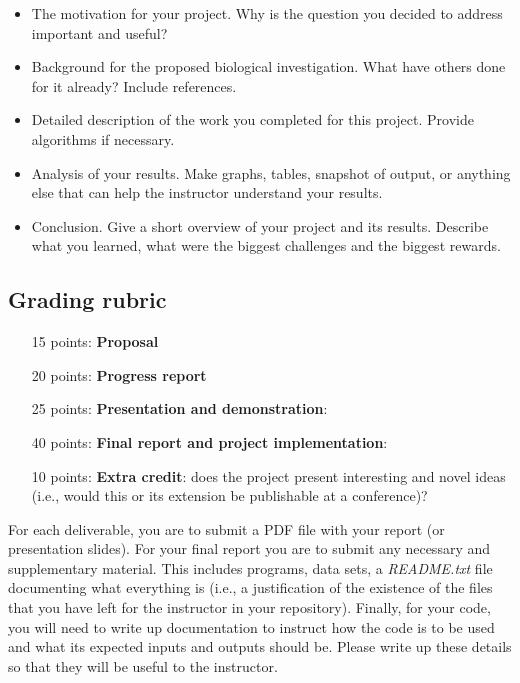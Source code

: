 \begin{enumerate}
\begin{itemize}

	\item The motivation for your project. Why is the question you decided to address important and useful?
	\item Background for the proposed biological investigation. What have others done for it already? Include references.
	\item Detailed  description of the work you completed for this project. Provide algorithms if necessary.
	\item Analysis of your results. Make graphs, tables, snapshot of output, or anything else that can help the instructor understand your results.
	\item Conclusion. Give a short overview of your project and its results. Describe what you learned, what were the biggest challenges and the biggest rewards. 
	\end{itemize}
	
\end{enumerate}

\subsection*{ Grading rubric}
\begin{enumerate}  	
  	\item[15 points:] \textbf{Proposal}
  	\item[20 points:] \textbf{Progress report}
 	\item[25 points:]  \textbf{Presentation and demonstration}:
 	\item[40 points:] \textbf{Final report and project implementation}:  
  	\item[10 points:]  \textbf{Extra credit}: does the project present interesting and novel ideas (i.e., would this or its extension be publishable at a conference)? 
\end{enumerate}

\noindent For each deliverable, you are to submit a PDF file with your report (or presentation slides). For your final report you are to submit any necessary and supplementary material. This includes programs, data sets, a \emph{README.txt} file documenting what everything is (i.e., a justification of the existence of the files that you have left for the instructor in your repository). Finally, for your code, you will need to write up documentation to instruct how the code is to be used and what its expected inputs and outputs should be. Please write up these details so that they will be useful to the instructor.

